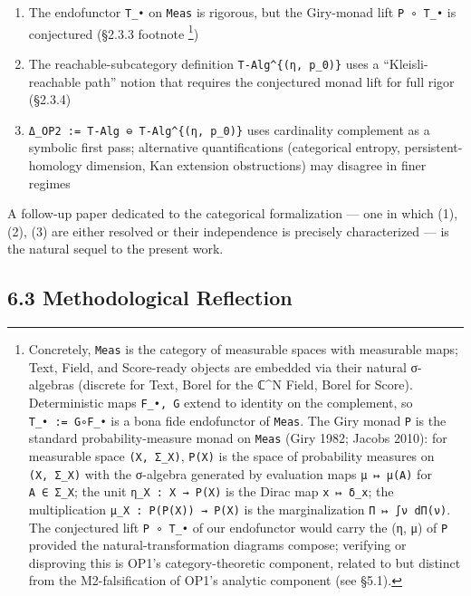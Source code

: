\documentclass[
]{article}
\providecommand{\tightlist}{%
  \setlength{\itemsep}{0pt}\setlength{\parskip}{0pt}}
\begin{document}
\begin{enumerate}
\def\labelenumi{\arabic{enumi}.}
\tightlist
\item
  The endofunctor \texttt{T\_•} on \texttt{Meas} is rigorous, but the
  Giry-monad lift \texttt{P\ ∘\ T\_•} is conjectured (§2.3.3 footnote
  \footnote{Concretely, \texttt{Meas} is the category of measurable
    spaces with measurable maps; Text, Field, and Score-ready objects
    are embedded via their natural σ-algebras (discrete for Text, Borel
    for the ℂ\^{}N Field, Borel for Score). Deterministic maps
    \texttt{F\_•,\ G} extend to identity on the complement, so
    \texttt{T\_•\ :=\ G∘F\_•} is a bona fide endofunctor of
    \texttt{Meas}. The Giry monad \texttt{P} is the standard
    probability-measure monad on \texttt{Meas} (Giry 1982; Jacobs 2010):
    for measurable space \texttt{(X,\ Σ\_X)}, \texttt{P(X)} is the space
    of probability measures on \texttt{(X,\ Σ\_X)} with the σ-algebra
    generated by evaluation maps \texttt{μ\ ↦\ μ(A)} for
    \texttt{A\ ∈\ Σ\_X}; the unit \texttt{η\_X\ :\ X\ →\ P(X)} is the
    Dirac map \texttt{x\ ↦\ δ\_x}; the multiplication
    \texttt{μ\_X\ :\ P(P(X))\ →\ P(X)} is the marginalization
    \texttt{Π\ ↦\ ∫ν\ dΠ(ν)}. The conjectured lift \texttt{P\ ∘\ T\_•}
    of our endofunctor would carry the (η, μ) of \texttt{P} provided the
    natural-transformation diagrams compose; verifying or disproving
    this is OP1's category-theoretic component, related to but distinct
    from the M2-falsification of OP1's analytic component (see §5.1).})
\item
  The reachable-subcategory definition \texttt{T-Alg\^{}\{(η,\ p\_0)\}}
  uses a ``Kleisli-reachable path'' notion that requires the conjectured
  monad lift for full rigor (§2.3.4)
\item
  \texttt{Δ\_OP2\ :=\ \textbar{}T-Alg\textbar{}\ ⊖\ \textbar{}T-Alg\^{}\{(η,\ p\_0)\}\textbar{}}
  uses cardinality complement as a symbolic first pass; alternative
  quantifications (categorical entropy, persistent-homology dimension,
  Kan extension obstructions) may disagree in finer regimes
\end{enumerate}

A follow-up paper dedicated to the categorical formalization --- one in
which (1), (2), (3) are either resolved or their independence is
precisely characterized --- is the natural sequel to the present work.

\hypertarget{methodological-reflection}{%
\subsection{6.3 Methodological
Reflection}\label{methodological-reflection}}
\end{document}
